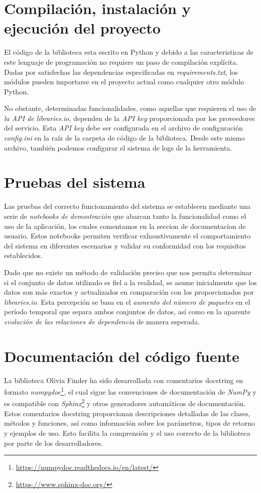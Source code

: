 \section{Compilación, instalación y ejecución del proyecto}

El código de la biblioteca esta escrito en Python y debido a las caracteristicas de este lenguaje de programación
no requiere un paso de compilación explícita. Dadas por 
satisfechas las dependencias especificadas en \textit{requirements.txt}, los módulos pueden importarse 
en el proyecto actual como cualquier otro módulo Python.

No obstante, determinadas funcionalidades, como aquellas que requieren el uso de \textit{la API de libraries.io}, 
dependen de la \textit{API key} proporcionada por los proveedores del servicio. Esta \textit{API key} 
debe ser configurada en el archivo de configuración \textit{config.ini} en la raíz de la carpeta de 
código de la biblioteca. Desde este mismo archivo, también podemos configurar el sistema de logs de 
la herramienta.

\section{Pruebas del sistema}

Las pruebas del correcto funcionamiento del sistema se establecen mediante una serie de \textit{notebooks de demostración} 
que abarcan tanto la funcionalidad como el uso de la aplicación, los cuales comentamos en la seccion de documentacion de usuario. Estos notebooks permiten verificar exhaustivamente el 
comportamiento del sistema en diferentes escenarios y validar su conformidad con los requisitos establecidos.

Dado que no existe un método de validación preciso que nos permita determinar si el conjunto de datos utilizado es fiel a 
la realidad, se asume inicialmente que los datos son más exactos y actualizados en comparación con los proporcionados por 
\textit{libraries.io}. Esta percepción se basa en el \textit{aumento del número de paquetes} en el período temporal que 
separa ambos conjuntos de datos, así como en la aparente \textit{evolución de las relaciones de dependencia} de manera esperada.

\section{Documentación del código fuente}

La biblioteca Olivia Finder ha sido desarrollada con comentarios docstring en formato 
\textit{numpydoc}\footnote{\url{https://numpydoc.readthedocs.io/en/latest/}}, 
el cual sigue las convenciones de documentación de \textit{NumPy} y es compatible con \textit{Sphinx}\footnote{\url{https://www.sphinx-doc.org/}} y otros generadores 
automáticos de documentación. Estos comentarios docstring proporcionan descripciones detalladas de 
las clases, métodos y funciones, así como información sobre los parámetros, tipos de retorno y ejemplos 
de uso. Esto facilita la comprensión y el uso correcto de la biblioteca por parte de los desarrolladores.

